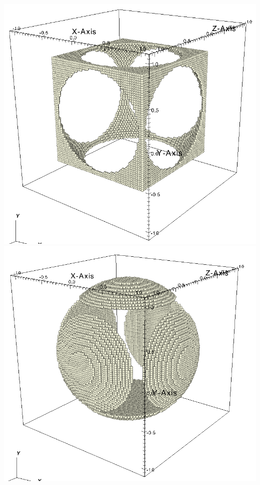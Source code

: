\begin{minipage}{0.4\textwidth}
  \centering
  \includegraphics[width=0.9\columnwidth]{FIGS/geometry/geom_diff_12.png}
  \includegraphics[width=0.9\columnwidth]{FIGS/geometry/geom_diff_21.png}
\end{minipage}

